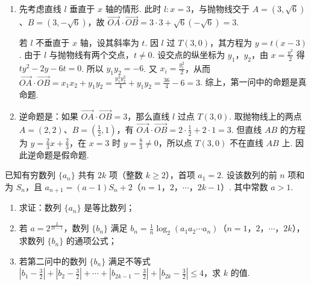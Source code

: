 \begin{solution}
\begin{enumerate}
\item 先考虑直线 \(l\) 垂直于 \(x\) 轴的情形. 此时 \(l:x=3\)，与抛物线交于 \(A=(3,\sqrt{6})\)、\(B=(3,-\sqrt{6})\)，故
\(\overrightarrow{OA}\cdot\overrightarrow{OB}=3\cdot3+\sqrt{6}(-\sqrt{6})=3\).

若 \(l\) 不垂直于 \(x\) 轴，设其斜率为 \(t\). 因 \(l\) 过 \(T(3,0)\)，其方程为 \(y=t(x-3)\). 由于 \(l\) 与抛物线有两个交点，\(t\neq0\). 设交点的纵坐标为 \(y_1\)，\(y_2\)，由 \(x=\frac{y^2}{2}\) 得
\(t y^2-2y-6t=0\). 所以 \(y_1y_2=-6\). 又 \(x_i=\frac{y_i^2}{2}\)，从而
\(\displaystyle \overrightarrow{OA}\cdot\overrightarrow{OB}=x_1x_2+y_1y_2=\frac{y_1^2y_2^2}{4}+y_1y_2=\frac{36}{4}-6=3\). 综上，第一问中的命题是真命题.
\item 逆命题是：如果 \(\overrightarrow{OA}\cdot\overrightarrow{OB}=3\)，那么直线 \(l\) 过点 \(T(3,0)\). 取抛物线上的两点 \(A=(2,2)\)、\(B=\left(\frac{1}{2},1\right)\)，有
\(\overrightarrow{OA}\cdot\overrightarrow{OB}=2\cdot\frac{1}{2}+2\cdot1=3\). 但直线 \(AB\) 的方程为 \(y=\frac{2}{3}x+\frac{2}{3}\)，在 \(x=3\) 时 \(y=\frac{8}{3}\neq0\)，所以点 \(T(3,0)\) 不在直线 \(AB\) 上. 因此逆命题是假命题.
\end{enumerate}
\end{solution}

\begin{problem}
已知有穷数列 \(\{a_{n}\}\) 共有 \(2k\) 项（整数 \(k \geqslant 2\)），首项 \(a_{1} = 2\). 设该数列的前 \(n\) 项和为 \(S_{n}\)，且 \(a_{n+1} = (a-1)S_{n} + 2\)（\(n = 1\)，\(2\)，\(\cdots\)，\(2k-1\)）. 其中常数 \(a > 1\).

\begin{enumerate}
\item 求证：数列 \( \{a_{n}\} \) 是等比数列；
\item 若 \(a = 2^{\frac{2}{2k-1}}\)，数列 \(\{b_n\}\) 满足 \(b_n = \frac{1}{n}\log_2(a_1a_2\cdots a_n)\)（\(n = 1\)，\(2\)，\(\cdots\)，\(2k\)），求数列 \(\{b_n\}\) 的通项公式；
\item 若第二问中的数列 \(\{b_n\}\) 满足不等式 \(\left|b_1 - \frac{3}{2}\right| + \left|b_2 - \frac{3}{2}\right| + \cdots + \left|b_{2k-1} - \frac{3}{2}\right| + \left|b_{2k} - \frac{3}{2}\right| \leqslant 4\)，求 \(k\) 的值.
\end{enumerate}
\end{problem}

